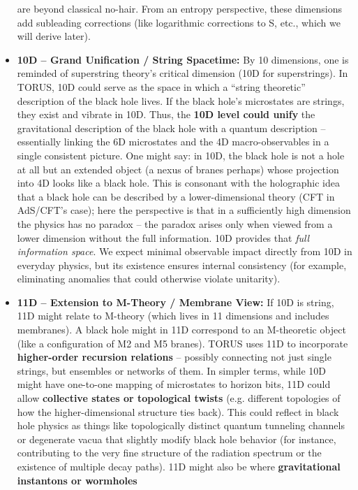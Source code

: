\documentclass[]{article}
\begin{document}
\begin{itemize}
  are beyond classical no-hair. From an entropy perspective, these
  dimensions add subleading corrections (like logarithmic corrections to
  S, etc., which we will derive later).
\item
  \textbf{10D -- Grand Unification / String Spacetime:} By 10
  dimensions, one is reminded of superstring theory's critical dimension
  (10D for superstrings). In TORUS, 10D could serve as the space in
  which a ``string theoretic'' description of the black hole lives. If
  the black hole's microstates are strings, they exist and vibrate in
  10D. Thus, the \textbf{10D level could unify} the gravitational
  description of the black hole with a quantum description --
  essentially linking the 6D microstates and the 4D macro-observables in
  a single consistent picture. One might say: in 10D, the black hole is
  not a hole at all but an extended object (a nexus of branes perhaps)
  whose projection into 4D looks like a black hole. This is consonant
  with the holographic idea that a black hole can be described by a
  lower-dimensional theory (CFT in AdS/CFT's case); here the perspective
  is that in a sufficiently high dimension the physics has no paradox --
  the paradox arises only when viewed from a lower dimension without the
  full information. 10D provides that \emph{full information space}. We
  expect minimal observable impact directly from 10D in everyday
  physics, but its existence ensures internal consistency (for example,
  eliminating anomalies that could otherwise violate unitarity).
\item
  \textbf{11D -- Extension to M-Theory / Membrane View:} If 10D is
  string, 11D might relate to M-theory (which lives in 11 dimensions and
  includes membranes). A black hole might in 11D correspond to an
  M-theoretic object (like a configuration of M2 and M5 branes). TORUS
  uses 11D to incorporate \textbf{higher-order recursion relations} --
  possibly connecting not just single strings, but ensembles or networks
  of them. In simpler terms, while 10D might have one-to-one mapping of
  microstates to horizon bits, 11D could allow \textbf{collective states
  or topological twists} (e.g. different topologies of how the
  higher-dimensional structure ties back). This could reflect in black
  hole physics as things like topologically distinct quantum tunneling
  channels or degenerate vacua that slightly modify black hole behavior
  (for instance, contributing to the very fine structure of the
  radiation spectrum or the existence of multiple decay paths). 11D
  might also be where \textbf{gravitational instantons or wormholes}

\end{itemize}
\end{document}
